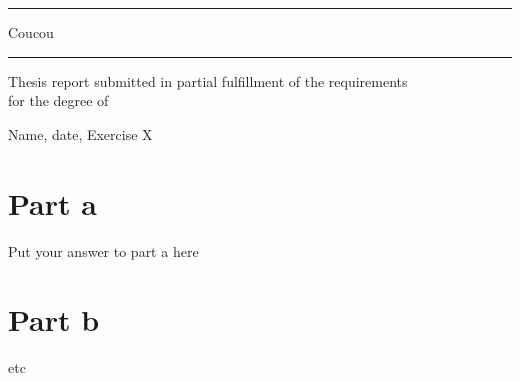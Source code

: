 \documentclass{article}
\begin{document}
\begin{titlepage}
    \centering
    
    \hrule
    \vspace{5pt}
    \begin{LARGE}
        Coucou
    \end{LARGE}
    \vspace{12pt}
    \hrule
    \vspace*{\fill}
    
    \begin{Large}
    Thesis report submitted in partial fulfillment of the requirements\\[6pt]
    for the degree of\\[6pt]
    \end{Large}

    \vspace*{\fill}
    \vspace*{\fill}
    
    \end{titlepage}
Name, date, Exercise X

\section*{Part a}

Put your answer to part a here

\section*{Part b}

etc
\end{document}
